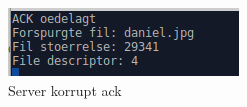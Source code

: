 \begin{figure}[H]
\centering
\includegraphics[width = 300 pt]{Img/ack_broke.PNG}
\caption{Server korrupt ack}
\label{fig:konceptbillede}
\end{figure}


